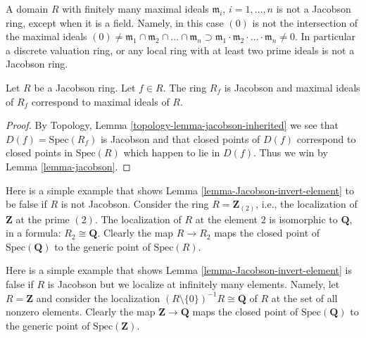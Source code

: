 \begin{example}
\label{example-not-jacobson}
A domain $R$ with finitely many maximal ideals
$\mathfrak m_i$, $i = 1, \ldots, n$ is not a
Jacobson ring, except when it is a field.
Namely, in this case $(0)$ is not the intersection
of the maximal ideals $(0) \not=
\mathfrak m_1 \cap \mathfrak m_2 \cap \ldots \cap \mathfrak m_n
\supset \mathfrak m_1 \cdot \mathfrak m_2 \cdot \ldots
\cdot \mathfrak m_n \not= 0$.
In particular a discrete valuation ring, or any local ring with
at least two prime ideals is not a Jacobson
ring.
\end{example}

\begin{lemma}
\label{lemma-Jacobson-invert-element}
Let $R$ be a Jacobson ring. Let $f \in R$.
The ring $R_f$ is Jacobson and maximal ideals
of $R_f$ correspond to maximal ideals of $R$.
\end{lemma}

\begin{proof}
By Topology, Lemma \ref{topology-lemma-jacobson-inherited}
we see that $D(f) = \text{Spec}(R_f)$ is Jacobson and
that closed points of $D(f)$
correspond to closed points in $\text{Spec}(R)$
which happen to lie in $D(f)$. Thus we win by
Lemma \ref{lemma-jacobson}.
\end{proof}

\begin{example}
\label{example-localize-not-preserve-closed-points}
Here is a simple example that shows Lemma \ref{lemma-Jacobson-invert-element}
to be false if $R$ is not Jacobson.
Consider the ring $R = \mathbf{Z}_{(2)}$, i.e., the localization
of $\mathbf{Z}$ at the prime $(2)$. The localization of $R$ at
the element $2$ is isomorphic to $\mathbf{Q}$, in a formula:
$R_2 \cong \mathbf{Q}$. Clearly the map $R \to R_2$ maps the
closed point of $\text{Spec}(\mathbf{Q})$ to the generic point
of $\text{Spec}(R)$.
\end{example}

\begin{example}
\label{example-infinite-localize-not-preserve-closed-points}
Here is a simple example that shows
Lemma \ref{lemma-Jacobson-invert-element}
is false if $R$ is Jacobson but we localize at infinitely
many elements.
Namely, let $R = \mathbf{Z}$ and consider the localization
$(R \setminus \{0\})^{-1}R \cong \mathbf{Q}$
of $R$ at the set of all nonzero elements.
Clearly the map $\mathbf{Z} \to \mathbf{Q}$ maps the
closed point of $\text{Spec}(\mathbf{Q})$ to the generic point
of $\text{Spec}(\mathbf{Z})$.
\end{example}

